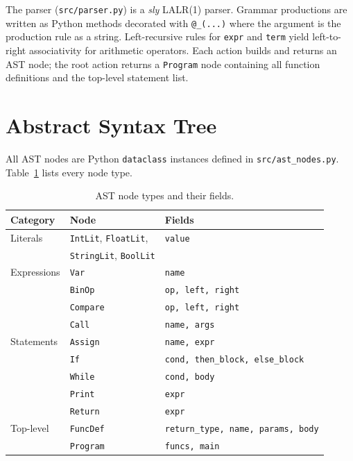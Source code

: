 \documentclass[12pt,a4paper]{report}
\begin{document}
The parser (\texttt{src/parser.py}) is a \textit{sly} LALR(1) parser. Grammar
productions are written as Python methods decorated with \texttt{@\_(...)}
where the argument is the production rule as a string.
Left-recursive rules for \texttt{expr} and \texttt{term} yield left-to-right
associativity for arithmetic operators.
Each action builds and returns an AST node; the root action returns a
\texttt{Program} node containing all function definitions and the
top-level statement list.

\section{Abstract Syntax Tree}

All AST nodes are Python \texttt{dataclass} instances defined in
\texttt{src/ast\_nodes.py}. Table~\ref{tab:ast} lists every node type.

\begin{table}[H]
\centering
\caption{AST node types and their fields.}
\label{tab:ast}
\begin{tabular}{@{} l l l @{}}
\toprule
\textbf{Category} & \textbf{Node} & \textbf{Fields} \\
\midrule
Literals    & \texttt{IntLit}, \texttt{FloatLit},
            & \texttt{value} \\
            & \texttt{StringLit}, \texttt{BoolLit} & \\
\addlinespace
Expressions & \texttt{Var}    & \texttt{name} \\
            & \texttt{BinOp}  & \texttt{op, left, right} \\
            & \texttt{Compare}& \texttt{op, left, right} \\
            & \texttt{Call}   & \texttt{name, args} \\
\addlinespace
Statements  & \texttt{Assign} & \texttt{name, expr} \\
            & \texttt{If}     & \texttt{cond, then\_block, else\_block} \\
            & \texttt{While}  & \texttt{cond, body} \\
            & \texttt{Print}  & \texttt{expr} \\
            & \texttt{Return} & \texttt{expr} \\
\addlinespace
Top-level   & \texttt{FuncDef}& \texttt{return\_type, name, params, body} \\
            & \texttt{Program}& \texttt{funcs, main} \\
\bottomrule
\end{tabular}
\end{table}
\end{document}
